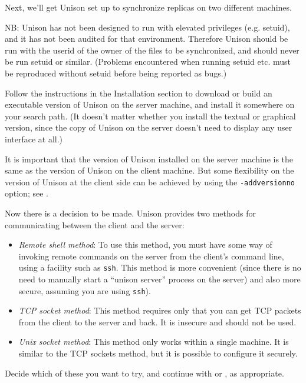 \documentclass{article}
\begin{document}

Next, we'll get Unison set up to synchronize replicas on two different
machines.

NB: Unison has not been designed to run with elevated privileges
(e.g. setuid), and it has not been audited for that environment.
Therefore Unison should be run with the userid of the owner of the
files to be synchronized, and should never be run setuid or similar.
(Problems encountered when running setuid etc. must be reproduced
without setuid before being reported as bugs.)

Follow the instructions in the Installation section to download or
build an executable version of Unison on the server machine, and
install it somewhere on your search path.  (It doesn't matter whether
you install the textual or graphical version, since the copy of Unison on
the server doesn't need to display any user interface at all.)

It is important that the version of Unison installed on the server
machine is the same as the version of Unison on the client machine.
But some flexibility on the version of Unison at the client side can
be achieved by using the \verb|-addversionno| option; see
.

Now there is a decision to be made.  Unison provides two methods for
communicating between the client and the server:
\begin{itemize}
\item {\em Remote shell method}: To use this method, you must have
  some way of invoking remote commands on the server from the client's
  command line, using a facility such as \verb|ssh|.
  This method is more convenient (since there is no need to manually
  start a ``unison server'' process on the server) and also more
  secure, assuming you are using \verb|ssh|).

\item {\em TCP socket method}: This method requires only that you can
  get TCP packets from the client to the server and back.  It is
  insecure and should not be used.

\item {\em Unix socket method}: This method only works within a
  single machine.  It is similar to the TCP sockets method, but it is
  possible to configure it securely.
\end{itemize}

Decide which of these you want to try, and continue with
 or
, as appropriate.
\end{document}
